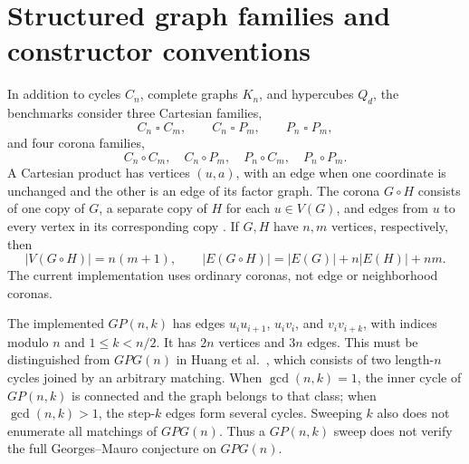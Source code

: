 \section{Structured graph families and constructor conventions}
In addition to cycles $C_n$, complete graphs $K_n$, and hypercubes $Q_d$,
the benchmarks consider three Cartesian families,
\[
 C_n\mathbin{\square} C_m,\qquad C_n\mathbin{\square} P_m,\qquad P_n\mathbin{\square} P_m,
\]
and four corona families,
\[
 C_n\circ C_m,\quad C_n\circ P_m,\quad P_n\circ C_m,\quad P_n\circ P_m.
\]
A Cartesian product has vertices $(u,a)$, with an edge when one coordinate
is unchanged and the other is an edge of its factor graph. The corona
$G\circ H$ consists of one copy of $G$, a separate copy of $H$ for each
$u\in V(G)$, and edges from $u$ to every vertex in its corresponding copy
\cite{frucht}. If $G,H$ have $n,m$ vertices, respectively, then
\[
|V(G\circ H)|=n(m+1),\qquad
|E(G\circ H)|=|E(G)|+n|E(H)|+nm.
\]
The current implementation uses ordinary coronas, not edge or neighborhood coronas.

The implemented $GP(n,k)$ has edges $u_iu_{i+1}$, $u_iv_i$, and $v_iv_{i+k}$,
with indices modulo $n$ and $1\leq k<n/2$. It has $2n$ vertices and $3n$ edges.
This must be distinguished from $GPG(n)$ in Huang et al.\ \cite{huang},
which consists of two length-$n$ cycles joined by an arbitrary matching.
When $\gcd(n,k)=1$, the inner cycle of $GP(n,k)$ is connected and the graph
belongs to that class; when $\gcd(n,k)>1$, the step-$k$ edges form several
cycles. Sweeping $k$ also does not enumerate all matchings of $GPG(n)$.
Thus a $GP(n,k)$ sweep does not verify the full Georges--Mauro conjecture
on $GPG(n)$.
